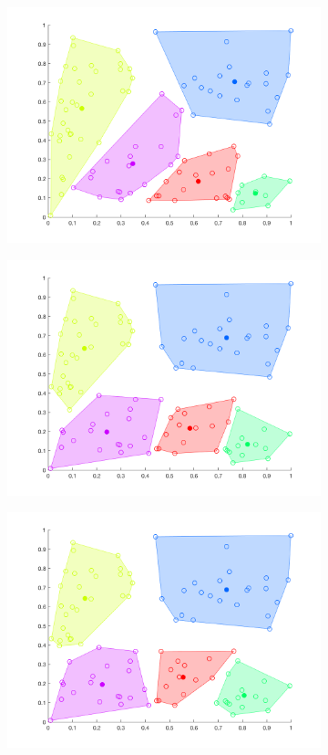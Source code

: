 \documentclass[12pt]{article}
\begin{document}
\begin{figure}[t!]
\begin{subfigure}[b]{0.25\textwidth}
        \includegraphics[width=\textwidth]{k-means_3}
    \end{subfigure}
    \begin{subfigure}[b]{0.25\textwidth}
        \includegraphics[width=\textwidth]{k-means_4}
    \end{subfigure}
    \begin{subfigure}[b]{0.25\textwidth}
        \includegraphics[width=\textwidth]{k-means_5}

\end{subfigure}
\end{figure}
\end{document}

